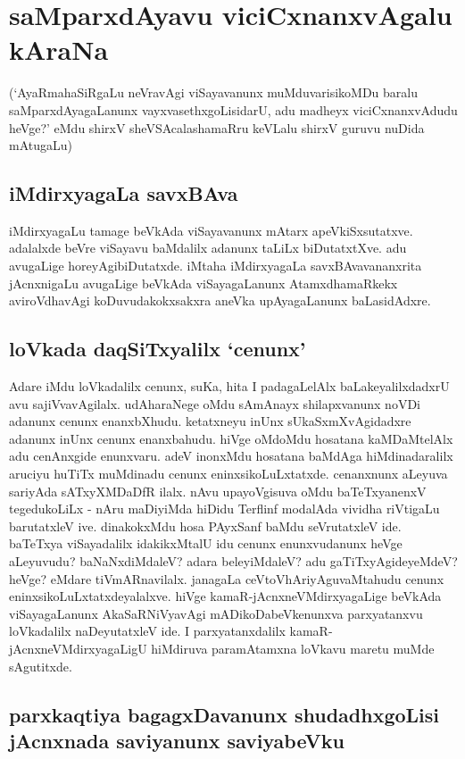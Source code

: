 \chapter{saMparxdAyavu viciCxnanxvAgalu kAraNa}

(`AyaRmahaSiRgaLu neVravAgi viSayavanunx muMduvarisikoMDu baralu saMparxdAyagaLanunx vayxvasethxgoLisidarU, adu madheyx  viciCxnanxvAdudu heVge?' eMdu shirxV sheVSAcalashamaRru keVLalu shirxV guruvu nuDida mAtugaLu)

\section*{iMdirxyagaLa savxBAva}

iMdirxyagaLu tamage beVkAda viSayavanunx mAtarx apeVkiSxsutatxve. adalalxde beVre viSayavu baMdalilx adanunx taLiLx biDutatxtXve. adu avugaLige horeyAgibiDutatxde. iMtaha iMdirxyagaLa savxBAvavananxrita jAcnxnigaLu avugaLige beVkAda viSayagaLanunx AtamxdhamaRkekx aviroVdhavAgi koDuvudakokxsakxra aneVka upAyagaLanunx baLasidAdxre.

\section*{loVkada daqSiTxyalilx `cenunx'}

Adare iMdu loVkadalilx cenunx, suKa, hita I padagaLelAlx baLakeyalilxdadxrU avu sajiVvavAgilalx. udAharaNege oMdu sAmAnayx shilapxvanunx noVDi adanunx cenunx enanxbXhudu. ketatxneyu inUnx sUkaSxmXvAgidadxre adanunx inUnx cenunx enanxbahudu. hiVge oMdoMdu hosatana kaMDaMtelAlx adu cenAnxgide enunxvaru. adeV inonxMdu hosatana baMdAga hiMdinadaralilx aruciyu huTiTx  muMdinadu cenunx eninxsikoLuLxtatxde. cenanxnunx aLeyuva sariyAda sATxyXMDaDfR ilalx. nAvu upayoVgisuva oMdu baTeTxyanenxV  tegedukoLiLx - nAru maDiyiMda hiDidu Terflinf modalAda vividha riVtigaLu barutatxleV ive. dinakokxMdu hosa PAyxSanf baMdu seVrutatxleV ide. baTeTxya viSayadalilx idakikxMtalU idu cenunx enunxvudanunx heVge aLeyuvudu? baNaNxdiMdaleV? adara beleyiMdaleV? adu gaTiTxyAgideyeMdeV? heVge? eMdare tiVmARnavilalx. janagaLa ceVtoVhAriyAguvaMtahudu cenunx eninxsikoLuLxtatxdeyalalxve. hiVge kamaR-jAcnxneVMdirxyagaLige beVkAda viSayagaLanunx AkaSaRNiVyavAgi mADikoDabeVkenunxva parxyatanxvu loVkadalilx naDeyutatxleV ide. I parxyatanxdalilx kamaR-jAcnxneVMdirxyagaLigU hiMdiruva paramAtamxna loVkavu maretu muMde sAgutitxde.

\section*{parxkaqtiya bagagxDavanunx shudadhxgoLisi jAcnxnada saviyanunx saviyabeVku}


